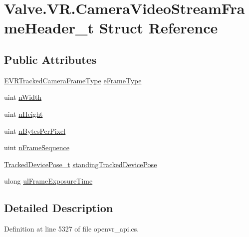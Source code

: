 \hypertarget{struct_valve_1_1_v_r_1_1_camera_video_stream_frame_header__t}{}\section{Valve.\+V\+R.\+Camera\+Video\+Stream\+Frame\+Header\+\_\+t Struct Reference}
\label{struct_valve_1_1_v_r_1_1_camera_video_stream_frame_header__t}
\subsection*{Public Attributes}
\begin{DoxyCompactItemize}
\item 
\mbox{\hyperlink{namespace_valve_1_1_v_r_a9962211bc3fe98c2683db188c12c9afd}{E\+V\+R\+Tracked\+Camera\+Frame\+Type}} \mbox{\hyperlink{struct_valve_1_1_v_r_1_1_camera_video_stream_frame_header__t_ac850cf60ff16b88ab34cea5504dd8664}{e\+Frame\+Type}}
\item 
uint \mbox{\hyperlink{struct_valve_1_1_v_r_1_1_camera_video_stream_frame_header__t_a7fd61b31649bf10e1aec2b1b916a23e5}{n\+Width}}
\item 
uint \mbox{\hyperlink{struct_valve_1_1_v_r_1_1_camera_video_stream_frame_header__t_ae5f4a7affc7cb01bbef60354dd8836a5}{n\+Height}}
\item 
uint \mbox{\hyperlink{struct_valve_1_1_v_r_1_1_camera_video_stream_frame_header__t_aba765394dd911585d85d3b863fd3aebb}{n\+Bytes\+Per\+Pixel}}
\item 
uint \mbox{\hyperlink{struct_valve_1_1_v_r_1_1_camera_video_stream_frame_header__t_a1e230fc8d6d95a9ff0ed6980993abff9}{n\+Frame\+Sequence}}
\item 
\mbox{\hyperlink{struct_valve_1_1_v_r_1_1_tracked_device_pose__t}{Tracked\+Device\+Pose\+\_\+t}} \mbox{\hyperlink{struct_valve_1_1_v_r_1_1_camera_video_stream_frame_header__t_a21d66f9ef4a4ad7238f9a0e6fec91d17}{standing\+Tracked\+Device\+Pose}}
\item 
ulong \mbox{\hyperlink{struct_valve_1_1_v_r_1_1_camera_video_stream_frame_header__t_a574f21f28247d150e80df30c757d9946}{ul\+Frame\+Exposure\+Time}}
\end{DoxyCompactItemize}


\subsection{Detailed Description}


Definition at line 5327 of file openvr\+\_\+api.\+cs.



